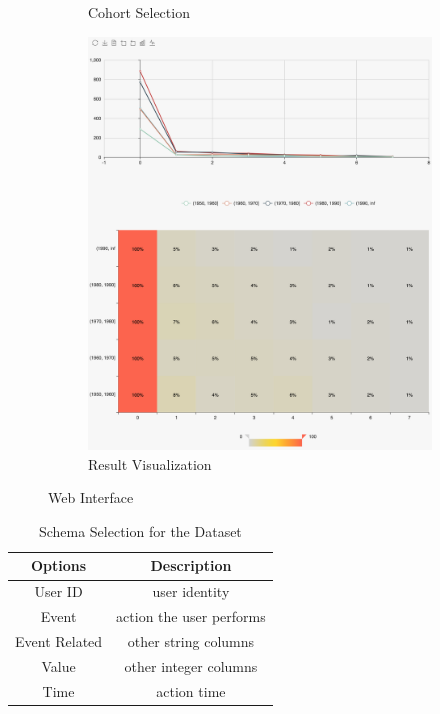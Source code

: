 \documentclass[10pt,conference,letterpaper]{IEEEtran}
\begin{document}
\begin{figure}
\begin{subfigure}{0.4\textwidth}
    \caption{Cohort Selection}
    \label{fig:cohort}
\end{subfigure}%
\begin{subfigure}{0.3\textwidth}
    \centering
    \includegraphics[width=0.9\linewidth]{chart.png}
    \caption{Result Visualization}
    \label{fig:visual}
\end{subfigure}%
\caption{Web Interface}
\end{figure}

\begin{table}[h!]
\begin{center}
    \begin{tabular}{ |c|c| }
        \hline
        Options & Description \\[0.5ex] 
        \hline\hline
        User ID & user identity \\
        \hline
        Event & action the user performs\\
        \hline
        Event Related & other string columns\\
        \hline
        Value & other integer columns\\
        \hline
        Time & action time \\
        \hline
    \end{tabular}
\end{center}
\caption{Schema Selection for the Dataset}
\label{table:schema}
\end{table}
\end{document}
